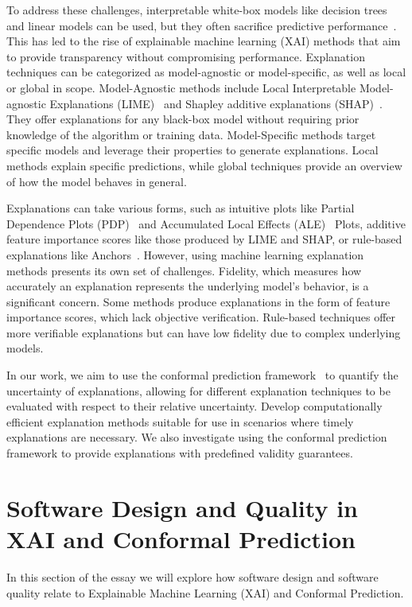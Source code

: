 \documentclass{article}
\begin{document}
To address these challenges, interpretable white-box models like decision trees and linear models can be used, but they often sacrifice predictive performance~\cite{a13010017, Mori2019}. This has led to the rise of explainable machine learning (XAI) methods that aim to provide transparency without compromising performance. Explanation techniques can be categorized as model-agnostic or model-specific, as well as local or global in scope. Model-Agnostic methods include Local Interpretable Model-agnostic Explanations (LIME)~\cite{lime} and Shapley additive explanations (SHAP)~\cite{shap}. They offer explanations for any black-box model without requiring prior knowledge of the algorithm or training data. Model-Specific methods target specific models and leverage their properties to generate explanations. Local methods explain specific predictions, while global techniques provide an overview of how the model behaves in general.


Explanations can take various forms, such as intuitive plots like Partial Dependence Plots (PDP)~\cite{PDP_article} and Accumulated Local Effects (ALE)~\cite{ALE_Apley} Plots, additive feature importance scores like those produced by LIME and SHAP, or rule-based explanations like Anchors~\cite{anchors}. However, using machine learning explanation methods presents its own set of challenges. Fidelity, which measures how accurately an explanation represents the underlying model's behavior, is a significant concern. Some methods produce explanations in the form of feature importance scores, which lack objective verification. Rule-based techniques offer more verifiable explanations but can have low fidelity due to complex underlying models.

In our work, we aim to use the conformal prediction framework~\cite{Gammerman_1998, Saunders_1999} to quantify the uncertainty of explanations, allowing for different explanation techniques to be evaluated with respect to their relative uncertainty. Develop computationally efficient explanation methods suitable for use in scenarios where timely explanations are necessary. We also investigate using the conformal prediction framework to provide explanations with predefined validity guarantees.


\section{Software Design and Quality in XAI and Conformal Prediction}
In this section of the essay we will explore how software design and software quality relate to Explainable Machine Learning (XAI) and Conformal Prediction.
\end{document}
